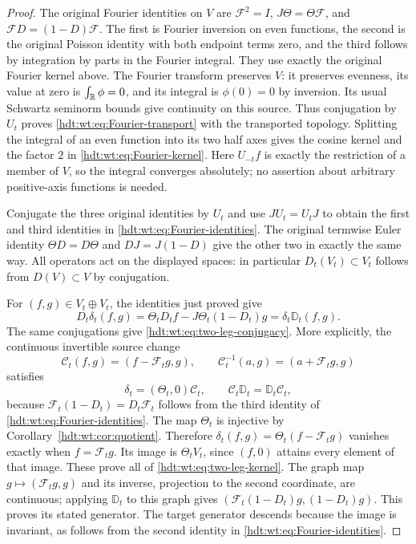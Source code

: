 \documentclass[11pt]{article}
\begin{document}
\begin{proof}
The original Fourier identities on $V$ are
$\mathcal F^2=I$, $J\Theta=\Theta\mathcal F$, and
$\mathcal FD=(1-D)\mathcal F$.  The first is Fourier inversion
on even functions, the second is the original Poisson identity
with both endpoint terms zero, and the third follows by integration
by parts in the Fourier integral.  They use exactly the original
Fourier kernel above.  The Fourier transform preserves $V$:
it preserves evenness, its value at zero is $\int_\mathbb R\phi=0$,
and its integral is $\phi(0)=0$ by inversion.  Its usual Schwartz
seminorm bounds give continuity on this source.  Thus conjugation
by $U_t$ proves \eqref{hdt:wt:eq:Fourier-transport} with the
transported topology.  Splitting the integral of an even function
into its two half axes gives the cosine kernel and the factor
$2$ in \eqref{hdt:wt:eq:Fourier-kernel}.  Here $U_{-t}f$ is exactly
the restriction of a member of $V$, so the integral converges
absolutely; no assertion about arbitrary positive-axis functions
is needed.

Conjugate the three original identities by $U_t$ and use
$JU_t=U_tJ$ to obtain the first and third identities in
\eqref{hdt:wt:eq:Fourier-identities}.  The original termwise
Euler identity $\Theta D=D\Theta$ and $DJ=J(1-D)$ give the
other two in exactly the same way.  All operators act on the
displayed spaces: in particular $D_t(V_t)\subset V_t$ follows
from $D(V)\subset V$ by conjugation.

For $(f,g)\in V_t\oplus V_t$, the identities just proved give
\[
 D_t\delta_t(f,g)
 =\Theta_tD_tf-J\Theta_t(1-D_t)g
 =\delta_t\mathbb D_t(f,g).
\]
The same conjugations give \eqref{hdt:wt:eq:two-leg-conjugacy}.
More explicitly, the continuous invertible source change
\[
 \mathcal C_t(f,g)=(f-\mathcal F_tg,g),\qquad
 \mathcal C_t^{-1}(a,g)=(a+\mathcal F_tg,g)
\]
satisfies
\[
 \delta_t=(\Theta_t,0)\mathcal C_t,\qquad
 \mathcal C_t\mathbb D_t=\mathbb D_t\mathcal C_t,
\]
because $\mathcal F_t(1-D_t)=D_t\mathcal F_t$ follows from
the third identity of \eqref{hdt:wt:eq:Fourier-identities}.
The map $\Theta_t$ is injective by
Corollary~\ref{hdt:wt:cor:quotient}.  Therefore
$\delta_t(f,g)=\Theta_t(f-\mathcal F_tg)$ vanishes exactly
when $f=\mathcal F_tg$.  Its image is $\Theta_tV_t$, since
$(f,0)$ attains every element of that image.  These prove all
of \eqref{hdt:wt:eq:two-leg-kernel}.  The graph map
$g\mapsto(\mathcal F_tg,g)$ and its inverse, projection to the
second coordinate, are continuous; applying $\mathbb D_t$
to this graph gives
$(\mathcal F_t(1-D_t)g,(1-D_t)g)$.  This proves its stated
generator.  The target generator descends because the image
is invariant, as follows from the second identity in
\eqref{hdt:wt:eq:Fourier-identities}.
\end{proof}
\end{document}
